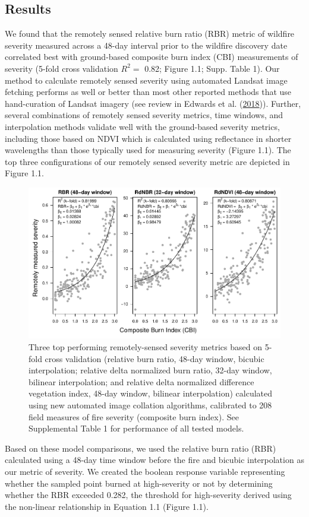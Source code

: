 \documentclass[twoside,12pt,final]{ucthesis-CA2012}
\begin{document}
\begin{ucmainmatter}
\section{Results}\label{results}

We found that the remotely sensed relative burn ratio (RBR) metric of
wildfire severity measured across a 48-day interval prior to the
wildfire discovery date correlated best with ground-based composite burn
index (CBI) measurements of severity (5-fold cross validation \(R^2 =\)
0.82; Figure 1.1; Supp. Table 1). Our method to calculate remotely
sensed severity using automated Landsat image fetching performs as well
or better than most other reported methods that use hand-curation of
Landsat imagery (see review in Edwards et al.
(\protect\hyperlink{ref-edwards2018}{2018})). Further, several
combinations of remotely sensed severity metrics, time windows, and
interpolation methods validate well with the ground-based severity
metrics, including those based on NDVI which is calculated using
reflectance in shorter wavelengths than those typically used for
measuring severity (Figure 1.1). The top three configurations of our
remotely sensed severity metric are depicted in Figure 1.1.
\begin{figure}
\centering
\includegraphics[width=6.00000in]{figure/chap01/remote-sensed-severity-calibration.pdf}
\caption{Three top performing remotely-sensed severity metrics based on
5-fold cross validation (relative burn ratio, 48-day window, bicubic
interpolation; relative delta normalized burn ratio, 32-day window,
bilinear interpolation; and relative delta normalized difference
vegetation index, 48-day window, bilinear interpolation) calculated
using new automated image collation algorithms, calibrated to 208 field
measures of fire severity (composite burn index). See Supplemental Table
1 for performance of all tested models.}
\end{figure}
Based on these model comparisons, we used the relative burn ratio (RBR)
calculated using a 48-day time window before the fire and bicubic
interpolation as our metric of severity. We created the boolean response
variable representing whether the sampled point burned at high-severity
or not by determining whether the RBR exceeded 0.282, the threshold for
high-severity derived using the non-linear relationship in Equation 1.1
(Figure 1.1).


\end{ucmainmatter}
\end{document}

